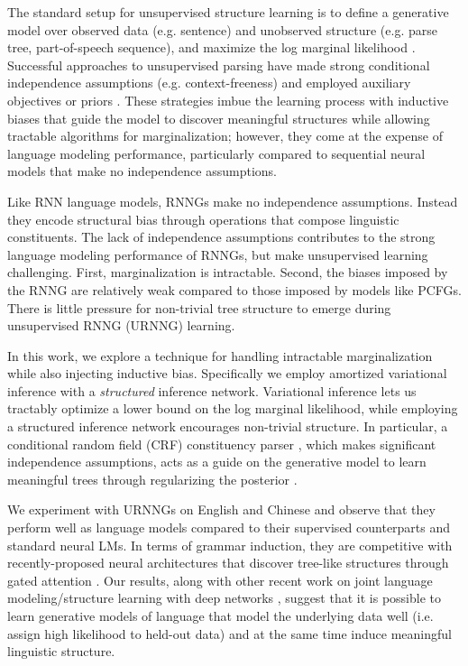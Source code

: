 \documentclass[11pt,a4paper]{article}
\begin{document}
The standard setup for unsupervised structure learning is to define a
generative model  over observed data
 (e.g. sentence) and unobserved structure  (e.g. parse
tree, part-of-speech sequence), and maximize the log marginal
likelihood
.
Successful approaches to unsupervised parsing have made strong
conditional independence assumptions (e.g. context-freeness) and
employed auxiliary objectives \cite{klein2002ccm} or priors
\cite{johnson2007pcfg}. These strategies imbue the
learning process with inductive biases that guide the model to discover 
meaningful structures while allowing tractable
algorithms for marginalization; however, they come at the
expense of language modeling performance, particularly compared to
sequential neural models that make no independence assumptions.

Like RNN language models, RNNGs make no independence
assumptions. Instead they encode structural bias
through operations that compose linguistic constituents.  The lack of
independence assumptions contributes to the strong language
modeling performance of RNNGs, but make unsupervised learning challenging. 
First, marginalization is intractable. Second, the biases
imposed by the RNNG are relatively weak compared to those imposed by models
like PCFGs. There is little pressure for non-trivial tree structure to emerge during unsupervised RNNG (URNNG) learning.

In this work, we explore a technique for handling intractable
marginalization while also injecting inductive bias.  Specifically we
employ amortized variational inference \cite{kingma2014vae,rezende2014vae,mnih2014neural} with a
\emph{structured} inference network. Variational inference lets us
tractably optimize a lower bound on the log marginal
likelihood, while employing a structured inference
network encourages non-trivial structure. In particular, a conditional random
field (CRF) constituency parser \cite{finkel2008crf,durrett2015crf},
which makes significant independence assumptions, acts as a guide on
the generative model to learn meaningful trees through regularizing the posterior \cite{ganchev2010post}.

We experiment with URNNGs on English and Chinese and observe that they
perform well as language models compared to their supervised counterparts
and standard neural LMs. In terms of grammar induction, they are
competitive with recently-proposed neural architectures that discover
tree-like structures through gated attention
\cite{shen2018nlm}. Our results, along with other recent work on
joint language modeling/structure learning with deep networks
\cite{shen2018nlm,shen2019ordered,wiseman2018templates,kawakami2018segmental},
suggest that it is possible to learn generative models of language that
model the underlying data well (i.e. assign high likelihood to held-out data) 
and at the same time induce meaningful linguistic structure.
\end{document}
